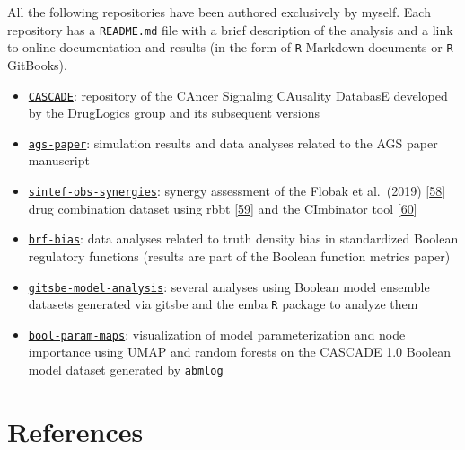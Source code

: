 \documentclass[
  12pt,
]{book}
\providecommand{\tightlist}{%
  \setlength{\itemsep}{0pt}\setlength{\parskip}{0pt}}
\begin{document}
All the following repositories have been authored exclusively by myself.
Each repository has a \texttt{README.md} file with a brief description of the analysis and a link to online documentation and results (in the form of \texttt{R} Markdown documents or \texttt{R} GitBooks).

\begin{itemize}
\tightlist
\item
  \href{https://github.com/druglogics/cascade}{\texttt{CASCADE}}: repository of the CAncer Signaling CAusality DatabasE developed by the DrugLogics group and its subsequent versions
\item
  \href{https://github.com/druglogics/ags-paper}{\texttt{ags-paper}}: simulation results and data analyses related to the AGS paper manuscript
\item
  \href{https://github.com/druglogics/sintef-obs-synergies}{\texttt{sintef-obs-synergies}}: synergy assessment of the Flobak et al.~(2019) {[}\protect\hyperlink{ref-Flobak2019}{58}{]} drug combination dataset using rbbt {[}\protect\hyperlink{ref-Vazquez2010}{59}{]} and the CImbinator tool {[}\protect\hyperlink{ref-Flobak2017}{60}{]}
\item
  \href{https://github.com/druglogics/brf-bias}{\texttt{brf-bias}}: data analyses related to truth density bias in standardized Boolean regulatory functions (results are part of the Boolean function metrics paper)
\item
  \href{https://github.com/druglogics/gitsbe-model-analysis}{\texttt{gitsbe-model-analysis}}: several analyses using Boolean model ensemble datasets generated via gitsbe and the emba \texttt{R} package to analyze them
\item
  \href{https://github.com/druglogics/bool-param-maps}{\texttt{bool-param-maps}}: visualization of model parameterization and node importance using UMAP and random forests on the CASCADE 1.0 Boolean model dataset generated by \texttt{abmlog}
\end{itemize}

\hypertarget{references}{%
\chapter*{References}\label{references}}
\end{document}
